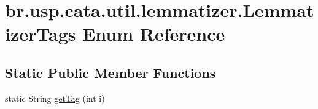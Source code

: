 \hypertarget{enumbr_1_1usp_1_1cata_1_1util_1_1lemmatizer_1_1_lemmatizer_tags}{\section{br.\+usp.\+cata.\+util.\+lemmatizer.\+Lemmatizer\+Tags Enum Reference}
\label{enumbr_1_1usp_1_1cata_1_1util_1_1lemmatizer_1_1_lemmatizer_tags}
}
\subsection*{Static Public Member Functions}
\begin{DoxyCompactItemize}
\item 
static String \hyperlink{enumbr_1_1usp_1_1cata_1_1util_1_1lemmatizer_1_1_lemmatizer_tags_a0ce6594cb3e0f8eb16b21d1ec5574791}{get\+Tag} (int i)
\end{DoxyCompactItemize}
